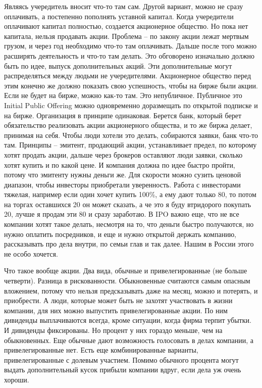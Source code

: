\documentclass[a4paper, 12pt]{article}
\begin{document}
Являясь учередитель вносит что-то там сам. Другой вариант, можно не сразу оплачивать, а постепенно пополнять уставной капитал. Когда учередители оплачивают капитал полностью, создается акционерное общество. Но пока нет капитала, нельзя продавать акции. Проблема -- по закону акции лежат мертвым грузом, и через год необходимо что-то там оплачивать. Дальше после того можно расширять деятельность и что-то там делать. Это обговорено изначально должно быть по идее, выпуск дополнительных акций. Эти дополнительные могут распределяться между людьми не учередителями. Акционерное общество перед этим конечно же должно показать свою успешность, чтобы на бирже были акции. Если не будет на бирже, можно как-то там. Это непубличное. Публичное это Initial Public Offering можно одновременно доразмещать по открытой подписке и на бирже. Организация в принципе одинаковая. Берется банк, который берет обязательство реализовать акции акционерного общества, и то же биржа делает, принимая на себя. Чтобы люди хотели это делать, собираются заявки, банк что-то там. Принципы -- эмитент, продающий акции, устанавливает предел, по которому хотят продать акции, дальше через брокеров оставляют люди заявки, сколько хотят купить и по какой цене. И компания должна по идее быстро пройти, потому что эмитенту нужны деньги же. Для скорости можно сузить ценовой диапазон, чтобы инвесторы приобретали уверенность. Работа с инвесторами тяжелая, например если один хочет купить 100\%, а ему дают только 80, то потом на торгах оставшихся 20 он может сказать, а че это я буду втридорого покупать 20, лучше я продам эти 80 и сразу заработаю. В IPO важно еще, что не все компании хотят такое делать, несмотря на то, что деньги быстро получаются, но нужно оплатить посредников, и еще и нужно открытой держать компанию, рассказывать про дела внутри, по семьи глав и так далее. Нашим в России этого не особо хочется. 

Что такое вообще акции. Два вида, обычные и привелегированные (не больше четверти). Разница в рискованности. Обыкновенные считаются самым опасным вложением, потому что нельзя предсказывать даже на месяц, можно и потерять, и приобрести. А люди, которые может быть не захотят участвовать в жизни компании, для них можно выпустить привелегированные акции. По ним дивиденды выплачиваются всегда, кроме ситуации, когда фирма терпит убытки. И дивиденды фиксированы. Но процент у них гораздо меньше, чем на обыкновенных. Еще обычные дают возможность голосовать в делах компании, а привелегированные нет. Есть еще комбинированные варианты, привелегированные с долевым участием. Помимо обычного процента могут выдать дополнительный кусок прибыли компании вдруг, если дела уж очень хороши. 
\end{document}
